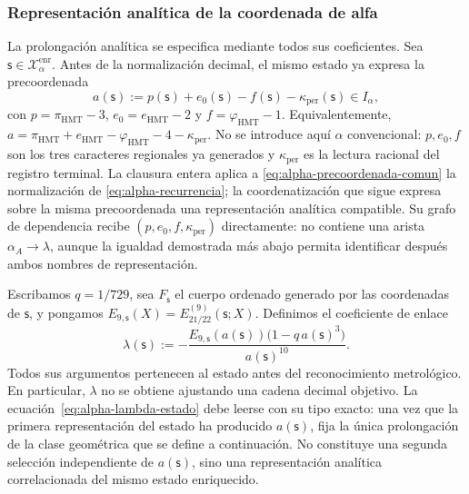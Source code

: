 \subsubsection{Representación analítica de la coordenada de alfa}
\label{subsec:alpha-lector-completo-rev08}

La prolongación analítica se especifica mediante todos sus coeficientes.
Sea \(\mathsf s\in\mathcal X_\alpha^{\mathrm{enr}}\). Antes
de la normalización decimal, el mismo estado ya expresa la precoordenada
\begin{equation}
 a(\mathsf s):=p(\mathsf s)+e_0(\mathsf s)-f(\mathsf s)
                 -\kappa_{\mathrm{per}}(\mathsf s)\in I_\alpha,
 \label{eq:alpha-precoordenada-comun}
\end{equation}
con \(p=\pi_{\mathrm{HMT}}-3\),
\(e_0=e_{\mathrm{HMT}}-2\) y
\(f=\varphi_{\mathrm{HMT}}-1\). Equivalentemente,
\(a=\pi_{\mathrm{HMT}}+e_{\mathrm{HMT}}-
\varphi_{\mathrm{HMT}}-4-\kappa_{\mathrm{per}}\). No se introduce aquí
\(\alpha\) convencional: \(p,e_0,f\) son los tres caracteres regionales ya
generados y \(\kappa_{\mathrm{per}}\) es la lectura racional del registro
terminal. La clausura entera aplica a
\eqref{eq:alpha-precoordenada-comun} la normalización de
\eqref{eq:alpha-recurrencia}; la coordenatización que sigue expresa sobre la misma
precoordenada una representación analítica compatible. Su grafo de
dependencia recibe \((p,e_0,f,\kappa_{\mathrm{per}})\) directamente: no
contiene una arista \(\alpha_A\to\lambda\), aunque la igualdad demostrada más
abajo permita identificar después ambos nombres de representación.

Escribamos \(q=1/729\), sea \(F_{\mathsf s}\) el cuerpo ordenado generado por
las coordenadas de \(\mathsf s\), y pongamos
\(E_{9,\mathsf s}(X)=E_{21/22}^{(9)}(\mathsf s;X)\). Definimos el coeficiente
de enlace
\begin{equation}
 \lambda(\mathsf s):=
 -\frac{E_{9,\mathsf s}(a(\mathsf s))
         \bigl(1-q\,a(\mathsf s)^3\bigr)}{a(\mathsf s)^{10}}.
 \label{eq:alpha-lambda-estado}
\end{equation}
Todos sus argumentos pertenecen al estado antes del reconocimiento
metrológico. En particular, \(\lambda\) no se obtiene ajustando una cadena
decimal objetivo. La ecuación~\eqref{eq:alpha-lambda-estado} debe leerse con
su tipo exacto: una vez que la primera representación del estado ha producido
\(a(\mathsf s)\), fija la única prolongación de la clase geométrica que se
define a continuación. No constituye una segunda selección independiente de
\(a(\mathsf s)\), sino una representación analítica correlacionada del mismo
estado enriquecido.


